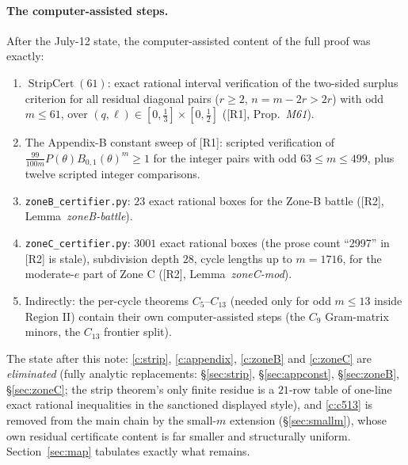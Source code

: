 \documentclass[11pt]{article}
\theoremstyle{remark}
\theoremstyle{plain}
\theoremstyle{plain}
\begin{document}
\paragraph{The computer-assisted steps.}  After the July-12 state, the
computer-assisted content of the full proof was exactly:
\begin{enumerate}[label=\textup{(C\arabic*)}]
\item\label{c:strip} $\operatorname{StripCert}(61)$: exact rational
interval verification of the two-sided surplus criterion for all residual
diagonal pairs ($r\ge2$, $n=m-2r>2r$) with odd $m\le61$, over
$(q,\ell)\in[0,\tfrac13]\times[0,\tfrac12]$ ([R1], Prop.~\emph{M61}).
\item\label{c:appendix} The Appendix-B constant sweep of [R1]: scripted
verification of $\frac{99}{100m}P(\theta)B_{0,1}(\theta)^m\ge1$ for the
integer pairs with odd $63\le m\le499$, plus twelve scripted integer
comparisons.
\item\label{c:zoneB} \texttt{zoneB\_certifier.py}: $23$ exact rational
boxes for the Zone-B battle ([R2], Lemma~\emph{zoneB-battle}).
\item\label{c:zoneC} \texttt{zoneC\_certifier.py}: $3001$ exact rational
boxes (the prose count ``2997'' in [R2] is stale), subdivision depth
$28$, cycle lengths up to $m=1716$, for the moderate-$e$ part of Zone C
([R2], Lemma~\emph{zoneC-mod}).
\item\label{c:c513} Indirectly: the per-cycle theorems $C_5$--$C_{13}$
(needed only for odd $m\le13$ inside Region II) contain their own
computer-assisted steps (the $C_9$ Gram-matrix minors, the $C_{13}$
frontier split).
\end{enumerate}
The state after this note: \ref{c:strip}, \ref{c:appendix},
\ref{c:zoneB} and \ref{c:zoneC} are \emph{eliminated} (fully analytic
replacements: \S\ref{sec:strip}, \S\ref{sec:appconst}, \S\ref{sec:zoneB},
\S\ref{sec:zoneC}; the strip theorem's only finite residue is a $21$-row
table of one-line exact rational inequalities in the sanctioned displayed
style), and \ref{c:c513} is removed from the main chain by the small-$m$
extension (\S\ref{sec:smallm}), whose own residual certificate content is
far smaller and structurally uniform.  Section~\ref{sec:map} tabulates
exactly what remains.
\end{document}

